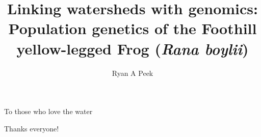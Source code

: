\documentclass[twoside,12pt,final]{ucthesis-CA2012}
\begin{document}
\begin{ucfrontmatter}


  \title{Linking watersheds with genomics: Population genetics of the Foothill
yellow-legged Frog (\emph{Rana boylii})}

  \author{Ryan A Peek}
   
  \othermemberC{} %

	\maketitle
	\approvalpage

    \begin{dedication}

      \vspace*{25ex}
      \begin{center}
      \begin{Large}

        To those who love the water

      \end{Large}
      \end{center}
  \end{dedication}
  \begin{acknowledgements}
    Thanks everyone!
  \end{acknowledgements}
  \begin{abstract}


\end{abstract}
\end{ucfrontmatter}
\end{document}
